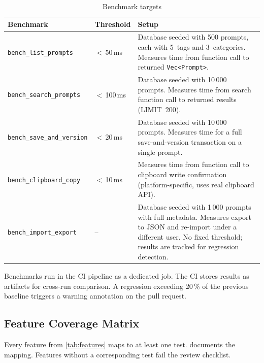 \documentclass[a4paper, 11pt, oneside]{report}
\begin{document}
\begin{table}[H]
  \centering
  \caption{Benchmark targets}
  \label{tab:benchmarks}
  \begin{tabularx}{\textwidth}{l l X}
    \toprule
    \textbf{Benchmark} & \textbf{Threshold} & \textbf{Setup} \\
    \midrule
    \texttt{bench\_list\_prompts} & $<$\,50\,ms &
      Database seeded with 500 prompts, each with 5~tags and
      3~categories.  Measures time from function call to
      returned \texttt{Vec<Prompt>}. \\
    \texttt{bench\_search\_prompts} & $<$\,100\,ms &
      Database seeded with 10\,000 prompts.  Measures time from
      search function call to returned results (LIMIT~200). \\
    \texttt{bench\_save\_and\_version} & $<$\,20\,ms &
      Database seeded with 10\,000 prompts.  Measures time for a
      full save-and-version transaction on a single prompt. \\
    \texttt{bench\_clipboard\_copy} & $<$\,10\,ms &
      Measures time from function call to clipboard write
      confirmation (platform-specific, uses real clipboard API). \\
    \texttt{bench\_import\_export} & -- &
      Database seeded with 1\,000 prompts with full metadata.
      Measures export to JSON and re-import under a different user.
      No fixed threshold; results are tracked for regression
      detection. \\
    \bottomrule
  \end{tabularx}
\end{table}

Benchmarks run in the CI pipeline as a dedicated job.  The CI stores
results as artifacts for cross-run comparison.  A regression exceeding
20\,\% of the previous baseline triggers a warning annotation on the
pull request.

\subsection{Feature Coverage Matrix}
\label{sec:feature-coverage}

Every feature from \cref{tab:features} maps to at least one test.
 documents the mapping.  Features without
a corresponding test fail the review checklist.
\end{document}

